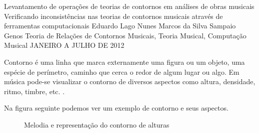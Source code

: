 \documentclass[11pt]{article}
\begin{document}
\graphicspath{{figs/}}


\dadosRelatorioFinal
{Levantamento de operações de teorias de contornos em análises de
  obras musicais}
{Verificando inconsistências nas teorias de contornos musicais através
  de ferramentas computacionais }
{Eduardo Lago Nunes}
{Marcos da Silva Sampaio}
{Genos}
{Teoria de Relações de Contornos Musicais, Teoria Musical, Computação Musical}
{JANEIRO A JULHO DE 2012}


\newpage

\setcounter{page}{1}
\onehalfspace

\label{sec:introducao}

Contorno é uma linha que marca externamente uma figura ou um objeto,
uma espécie de perímetro, caminho que cerca o redor de algum lugar ou
algo. Em música pode-se visualizar o contorno de diversos aspectos
como altura, densidade, ritmo, timbre, etc.
\cite[p. 01]{Sampaio2008}.

Na figura seguinte podemos ver um exemplo de contorno e seus aspectos.
\begin{figure}
  \centering
  \caption{Melodia e representação do contorno de alturas}
  \label{fig:melodia-representacao}
\end{figure}
\end{document}
